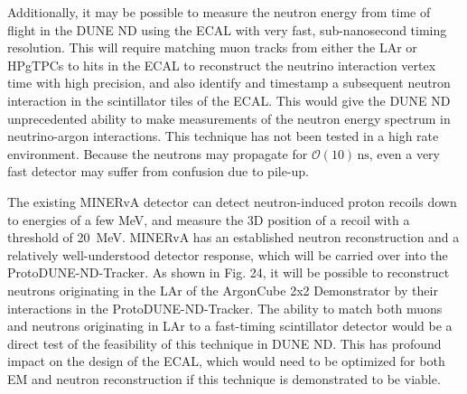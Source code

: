 Additionally, it may be possible to measure the neutron energy from time of flight in the DUNE ND using the ECAL with very fast, sub-nanosecond timing resolution. This will require matching muon tracks from either the LAr or HPgTPCs to hits in the ECAL to reconstruct the neutrino interaction vertex time with high precision, and also identify and timestamp a subsequent neutron interaction in the scintillator tiles of the ECAL. This would give the DUNE ND unprecedented ability to make measurements of the neutron energy spectrum in neutrino-argon interactions. This technique has not been tested in a high rate environment. Because the neutrons may propagate for $\mathcal{O}\left(10\right)\,\mathrm{ns}$, even a very fast detector may suffer from confusion due to pile-up.

The existing MINERvA detector can detect neutron-induced proton recoils down to energies of a few MeV, and measure the 3D position of a recoil with a threshold of 20~MeV.  MINERvA has an established neutron reconstruction and a relatively well-understood detector response, which will be carried over into the ProtoDUNE-ND-Tracker.  As shown in Fig. 24, it will be possible to reconstruct neutrons originating in the LAr of the ArgonCube 2x2 Demonstrator by their interactions in the ProtoDUNE-ND-Tracker. The ability to match both muons and neutrons originating in LAr to a fast-timing scintillator detector would be a direct test of the feasibility of this technique in DUNE ND. This has profound impact on the design of the ECAL, which would need to be optimized for both EM and neutron reconstruction if this technique is demonstrated to be viable. 
 
 
\FloatBarrier
